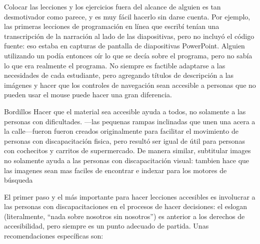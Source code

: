 
Colocar las lecciones y los ejercicios fuera del alcance de alguien es tan desmotivador como parece,
y es muy fácil hacerlo sin darse cuenta.
Por ejemplo,
las primeras lecciones de programación en línea que escribí tenían una transcripción de la narración
al lado de las diapositivas,
pero no incluyó el código fuente:
eso estaba en capturas de pantalla de diapositivas PowerPoint.
Alguien utilizando un 
podía entonces oír lo que se decía sobre el programa,
pero no sabía lo que era realmente el programa.
No siempre es factible adaptarse a las necesidades de cada estudiante,
pero agregando títulos de descripción a las imágenes
y hacer que los controles de navegación sean accesible a personas que no pueden usar el mouse
puede hacer una gran diferencia.

\begin{aside}{Bordillos}
  Hacer que el material sea accesible ayuda a todos,
  no solamente a las personas con dificultades.
---las pequenas rampas inclinadas que unen una acera a la calle---fueron
  fueron creados originalmente para facilitar el movimiento de personas con discapacitación fisica,
  pero resultó ser igual de útil para personas con cochecitos y carritos de supermercado.
  De manera similar,
  subtitular images no solamente ayuda a las personas con discapacitación visual:
  tambien hace que las imagenes sean mas faciles de encontrar e indexar para los motores de búsqueda
\end{aside}

El primer paso y el más importante para hacer lecciones accesibles es
involucrar a las personas con discapacitaciones en el procesos de hacer decisiones:
el eslogan \emph{}
(literalmente, ``nada sobre nosotros sin nosotros'')
es anterior a los derechos de accesibilidad,
pero siempre es un punto adecuado de partida.
Unas recomendaciones específicas son:

